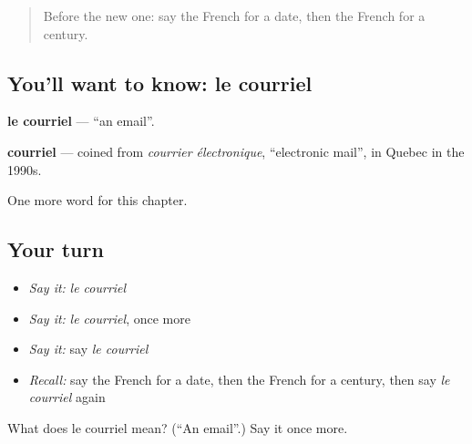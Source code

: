 \label{lesson:FR-C135-courriel}



\begin{quote}
Before the new one: say the French for a date, then the French for a century.
\end{quote}

\subsection*{You'll want to know: le courriel}
\textbf{le courriel} — \textquotedblleft{}an email\textquotedblright{}.

\begin{cousinweb}
\textbf{courriel} — coined from \emph{courrier électronique}, \textquotedblleft{}electronic mail\textquotedblright{}, in Quebec in the 1990s.
\end{cousinweb}

\begin{grammarlens}[title={What you've built}]
One more word for this chapter.
\end{grammarlens}

\subsection*{Your turn}
\begin{itemize}
\raggedright
  \item \emph{Say it:} \emph{le courriel}
  \item \emph{Say it:} \emph{le courriel}, once more
  \item \emph{Say it:} say \emph{le courriel}
  \item \emph{Recall:} say the French for a date, then the French for a century, then say \emph{le courriel} again
\end{itemize}

\begin{tcolorbox}[breakable,colback=teal!4,colframe=teal!35!black,title={Before you move on}]
What does le courriel mean? (\textquotedblleft{}An email\textquotedblright{}.) Say it once more.
\end{tcolorbox}
